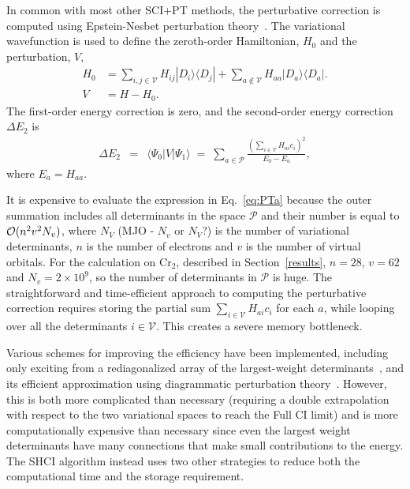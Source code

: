 \documentclass[%
reprint,
 superscriptaddress,
 amsmath,amssymb,
 aps,
]{revtex4-1}
\def\beq{\begin{eqnarray}}
\def\eeq{\end{eqnarray}}
\def\V{\mathcal{V}}
\def\P{\mathcal{P}}
\begin{document}
In common with most other SCI+PT methods, the perturbative correction is
computed using Epstein-Nesbet perturbation theory~\cite{Eps-PR-26,Nes-PRS-55}.
The variational wavefunction is used to define the zeroth-order Hamiltonian, $H_0$ and the perturbation, $V$,
\begin{align}
H_0 &= \sum_{i,j \in \V} H_{ij} |D_i\rangle\langle D_j| + \sum_{a \notin \V } H_{aa} |D_a\rangle\langle D_a|. \nonumber\\
V &= H - H_0 . \label{eq:part}
\end{align}
The first-order energy correction is zero, and the second-order energy correction $\Delta E_{2}$ is
\beq
 \Delta E_{2} &=& \langle\Psi_0|V|\Psi_1\rangle
 \;=\; \sum_{a \in \P} \frac{\left(\sum_{i \in \V} H_{ai} c_i\right)^2}{E_0 - E_a},
\label{eq:PTa}
\eeq
where $E_a=H_{aa}$.

It is expensive to evaluate the expression in Eq.~\ref{eq:PTa} because the outer summation includes all determinants in the space $\P$ and their number is equal to 
{\color{red}${\cal O}(n^2v^2N_v)$, where $N_V$ (MJO - $N_v$ or $N_V$?)} is the number of variational determinants, $n$ is the number of electrons and $v$ is
the number of virtual orbitals. For the calculation on Cr$_2$, described in Section~\ref{results},
$n=28$, $v=62$ and $N_v=2 \times 10^9$, so the number of determinants in $\P$ is huge.
The straightforward
and time-efficient approach to computing the perturbative correction requires storing
the partial sum $\sum_{i \in \V} H_{ai} c_i$ for each $a$, while
looping over all the determinants $i\in\V$. This creates a severe memory bottleneck.

Various schemes for improving the efficiency have been implemented, including only exciting from
a rediagonalized array of the largest-weight determinants~\cite{EvaDauMal-CP-83}, and its efficient approximation using
diagrammatic perturbation theory~\cite{CimPer-JCoP-87}.
However, this is both more complicated than necessary (requiring a double extrapolation with respect to the two
variational spaces to reach the Full CI limit) and is more computationally expensive than necessary since even
the largest weight determinants have many connections that make small contributions to the energy.
The SHCI algorithm instead uses two other strategies to reduce both the computational time and the storage requirement.
\end{document}

